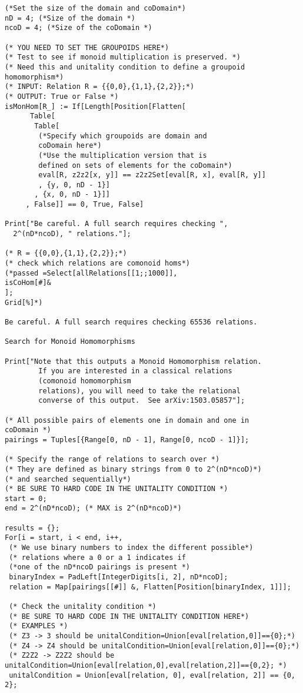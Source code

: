 \begin{lstlisting}
(*Set the size of the domain and coDomain*)
nD = 4; (*Size of the domain *)
ncoD = 4; (*Size of the coDomain *)

(* YOU NEED TO SET THE GROUPOIDS HERE*)
(* Test to see if monoid multiplication is preserved. *)
(* Need this and unitality condition to define a groupoid 
homomorphism*)
(* INPUT: Relation R = {{0,0},{1,1},{2,2}};*)
(* OUTPUT: True or False *)
isMonHom[R_] := If[Length[Position[Flatten[
      Table[
       Table[
        (*Specify which groupoids are domain and 
        coDomain here*)
        (*Use the multiplication version that is 
        defined on sets of elements for the coDomain*)
        eval[R, z2z2[x, y]] == z2z2Set[eval[R, x], eval[R, y]]
        , {y, 0, nD - 1}]
       , {x, 0, nD - 1}]]
     , False]] == 0, True, False]

Print["Be careful. A full search requires checking ",
  2^(nD*ncoD), " relations."];

(* R = {{0,0},{1,1},{2,2}};*)
(* check which relations are comonoid homs*)
(*passed =Select[allRelations[[1;;1000]],
isCoHom[#]&
];
Grid[%]*)

Be careful. A full search requires checking 65536 relations.

Search for Monoid Homomorphisms

Print["Note that this outputs a Monoid Homomorphism relation.
        If you are interested in a classical relations 
        (comonoid homomorphism 
        relations), you will need to take the relational 
        converse of this output.  See arXiv:1503.05857"];

(* All possible pairs of elements one in domain and one in
coDomain *)
pairings = Tuples[{Range[0, nD - 1], Range[0, ncoD - 1]}];

(* Specify the range of relations to search over *)
(* They are defined as binary strings from 0 to 2^(nD*ncoD)*)
(* and searched sequentially*)
(* BE SURE TO HARD CODE IN THE UNITALITY CONDITION *)
start = 0;
end = 2^(nD*ncoD); (* MAX is 2^(nD*ncoD)*)

results = {};
For[i = start, i < end, i++,
 (* We use binary numbers to index the different possible*)
 (* relations where a 0 or a 1 indicates if 
 (*one of the nD*ncoD pairings is present *)
 binaryIndex = PadLeft[IntegerDigits[i, 2], nD*ncoD];
 relation = Map[pairings[[#]] &, Flatten[Position[binaryIndex, 1]]];
 
 (* Check the unitality condition *)
 (* BE SURE TO HARD CODE IN THE UNITALITY CONDITION HERE*)
 (* EXAMPLES *)
 (* Z3 -> 3 should be unitalCondition=Union[eval[relation,0]]=={0};*)
 (* Z4 -> Z4 should be unitalCondition=Union[eval[relation,0]]=={0};*)
 (* Z2Z2 -> Z2Z2 should be unitalCondition=Union[eval[relation,0],eval[relation,2]]=={0,2}; *)
 unitalCondition = Union[eval[relation, 0], eval[relation, 2]] == {0, 2};
 

\end{lstlisting}
